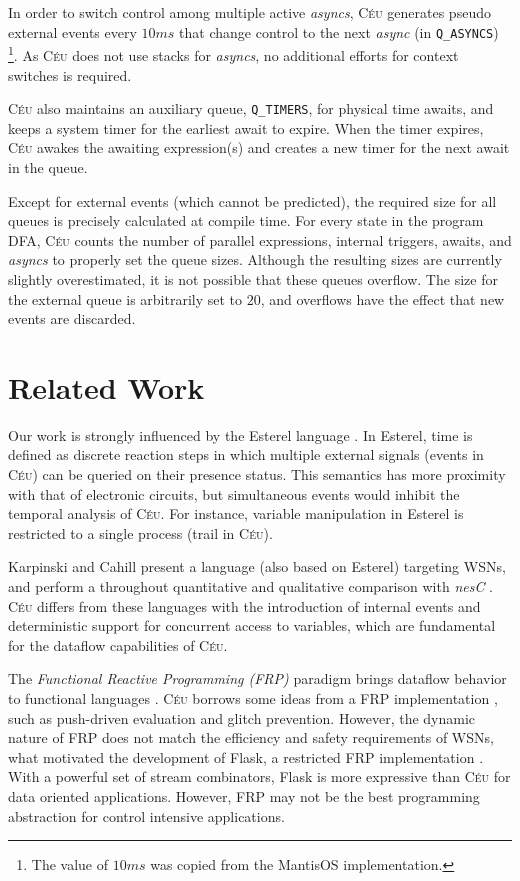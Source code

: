 \documentclass{sig-alternate-ipsn09}
\newcommand{\2}{\;\;}
\newcommand{\5}{\;\;\;\;\;}
\newcommand{\CEU}{\textsc{C\'{e}u}}
\newcommand{\nesc}{\emph{nesC}}
\newcommand{\code}[1] {{\small{\texttt{#1}}}}
\begin{document}
In order to switch control among multiple active \emph{asyncs}, \CEU{} 
generates pseudo external events every $10ms$ that change control to the next 
\emph{async} (in \code{Q\_ASYNCS})%
\footnote{The value of $10ms$ was copied from the MantisOS implementation.}.
As \CEU{} does not use stacks for \emph{asyncs}, no additional efforts for 
context switches is required.

\CEU{} also maintains an auxiliary queue, \code{Q\_TIMERS}, for physical time 
awaits, and keeps a system timer for the earliest await to expire.
When the timer expires, \CEU{} awakes the awaiting expression(s) and creates a 
new timer for the next await in the queue.

Except for external events (which cannot be predicted), the required size for 
all queues is precisely calculated at compile time.
For every state in the program DFA, \CEU{} counts the number of parallel 
expressions, internal triggers, awaits, and \emph{asyncs} to properly set the 
queue sizes.
Although the resulting sizes are currently slightly overestimated, it is not 
possible that these queues overflow.
The size for the external queue is arbitrarily set to $20$, and overflows have 
the effect that new events are discarded.

\section{Related Work}
\label{sec:related}

Our work is strongly influenced by the Esterel language \cite{esterel.design}.
In Esterel, time is defined as discrete reaction steps in which multiple 
external signals (events in \CEU) can be queried on their presence status.
This semantics has more proximity with that of electronic circuits, but 
simultaneous events would inhibit the temporal analysis of \CEU.
For instance, variable manipulation in Esterel is restricted to a single 
process (trail in \CEU).

Karpinski and Cahill present a language (also based on Esterel) targeting WSNs, 
and perform a throughout quantitative and qualitative comparison with \nesc 
\cite{wsn.sol}.
\CEU{} differs from these languages with the introduction of internal events 
and deterministic support for concurrent access to variables, which are 
fundamental for the dataflow capabilities of \CEU.

The \emph{Functional Reactive Programming (FRP)} paradigm brings dataflow 
behavior to functional languages \cite{frp.principles}.
\CEU{} borrows some ideas from a FRP implementation \cite{frtime.embedding}, 
such as push-driven evaluation and glitch prevention.
However, the dynamic nature of FRP does not match the efficiency and safety 
requirements of WSNs, what motivated the development of Flask, a restricted FRP 
implementation \cite{wsn.flask}.
With a powerful set of stream combinators, Flask is more expressive than \CEU{} 
for data oriented applications.
However, FRP may not be the best programming abstraction for control intensive 
applications.
\end{document}
